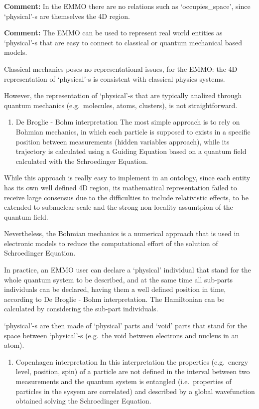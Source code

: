 \documentclass[a4paper,]{report}
\providecommand{\tightlist}{%
  \setlength{\itemsep}{0pt}\setlength{\parskip}{0pt}}
\begin{document}
\textbf{Comment:} In the EMMO there are no relations such as
`occupies\_space', since `physical'-s are themselves the 4D region.

\textbf{Comment:} The EMMO can be used to represent real world entities
as `physical'-s that are easy to connect to classical or quantum
mechanical based models.

Classical mechanics poses no representational issues, for the EMMO: the
4D representation of `physical'-s is consistent with classical physics
systems.

However, the representation of `physical'-s that are typically analized
through quantum mechanics (e.g.~molecules, atoms, clusters), is not
straightforward.

\begin{enumerate}
\def\labelenumi{\arabic{enumi})}
\tightlist
\item
  De Broglie - Bohm interpretation The most simple approach is to rely
  on Bohmian mechanics, in which each particle is supposed to exists in
  a specific position between measurements (hidden variables approach),
  while its trajectory is calculated using a Guiding Equation based on a
  quantum field calculated with the Schroedinger Equation.
\end{enumerate}

While this approach is really easy to implement in an ontology, since
each entity has its own well defined 4D region, its mathematical
representation failed to receive large consensus due to the difficulties
to include relativistic effects, to be extended to subnuclear scale and
the strong non-locality assumtpion of the quantum field.

Nevertheless, the Bohmian mechanics is a numerical approach that is used
in electronic models to reduce the computational effort of the solution
of Schroedinger Equation.

In practice, an EMMO user can declare a `physical' individual that stand
for the whole quantum system to be described, and at the same time all
sub-parts individuals can be declared, having them a well defined
position in time, according to De Broglie - Bohm interpretation. The
Hamiltonian can be calculated by considering the sub-part individuals.

`physical'-s are then made of `physical' parts and `void' parts that
stand for the space between `physical'-s (e.g.~the void between
electrons and nucleus in an atom).

\begin{enumerate}
\def\labelenumi{\arabic{enumi})}
\setcounter{enumi}{1}
\tightlist
\item
  Copenhagen interpretation In this interpretation the properties
  (e.g.~energy level, position, spin) of a particle are not defined in
  the interval between two measurements and the quantum system is
  entangled (i.e.~properties of particles in the sysyem are correlated)
  and described by a global wavefunction obtained solving the
  Schroedinger Equation.
\end{enumerate}
\end{document}
